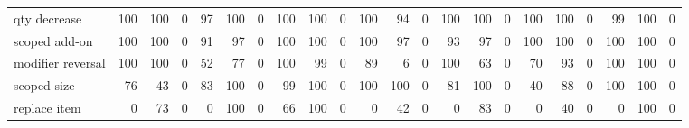 \begin{tabular}{lrrrrrrrrrrrrrrrrrrrrr}
qty decrease & \cellcolor[gray]{0.65}100 & \cellcolor[gray]{0.65}100 & \cellcolor[gray]{1.00}0 & \cellcolor[gray]{0.66}97 & \cellcolor[gray]{0.65}100 & \cellcolor[gray]{1.00}0 & \cellcolor[gray]{0.65}100 & \cellcolor[gray]{0.65}100 & \cellcolor[gray]{1.00}0 & \cellcolor[gray]{0.65}100 & \cellcolor[gray]{0.67}94 & \cellcolor[gray]{1.00}0 & \cellcolor[gray]{0.65}100 & \cellcolor[gray]{0.65}100 & \cellcolor[gray]{1.00}0 & \cellcolor[gray]{0.65}100 & \cellcolor[gray]{0.65}100 & \cellcolor[gray]{1.00}0 & \cellcolor[gray]{0.65}99 & \cellcolor[gray]{0.65}100 & \cellcolor[gray]{1.00}0 \\
scoped add-on & \cellcolor[gray]{0.65}100 & \cellcolor[gray]{0.65}100 & \cellcolor[gray]{1.00}0 & \cellcolor[gray]{0.68}91 & \cellcolor[gray]{0.66}97 & \cellcolor[gray]{1.00}0 & \cellcolor[gray]{0.65}100 & \cellcolor[gray]{0.65}100 & \cellcolor[gray]{1.00}0 & \cellcolor[gray]{0.65}100 & \cellcolor[gray]{0.66}97 & \cellcolor[gray]{1.00}0 & \cellcolor[gray]{0.67}93 & \cellcolor[gray]{0.66}97 & \cellcolor[gray]{1.00}0 & \cellcolor[gray]{0.65}100 & \cellcolor[gray]{0.65}100 & \cellcolor[gray]{1.00}0 & \cellcolor[gray]{0.65}100 & \cellcolor[gray]{0.65}100 & \cellcolor[gray]{1.00}0 \\
modifier reversal & \cellcolor[gray]{0.65}100 & \cellcolor[gray]{0.65}100 & \cellcolor[gray]{1.00}0 & \cellcolor[gray]{0.82}52 & \cellcolor[gray]{0.73}77 & \cellcolor[gray]{1.00}0 & \cellcolor[gray]{0.65}100 & \cellcolor[gray]{0.65}99 & \cellcolor[gray]{1.00}0 & \cellcolor[gray]{0.69}89 & \cellcolor[gray]{0.98}6 & \cellcolor[gray]{1.00}0 & \cellcolor[gray]{0.65}100 & \cellcolor[gray]{0.78}63 & \cellcolor[gray]{1.00}0 & \cellcolor[gray]{0.76}70 & \cellcolor[gray]{0.67}93 & \cellcolor[gray]{1.00}0 & \cellcolor[gray]{0.65}100 & \cellcolor[gray]{0.65}100 & \cellcolor[gray]{1.00}0 \\
scoped size & \cellcolor[gray]{0.74}76 & \cellcolor[gray]{0.85}43 & \cellcolor[gray]{1.00}0 & \cellcolor[gray]{0.71}83 & \cellcolor[gray]{0.65}100 & \cellcolor[gray]{1.00}0 & \cellcolor[gray]{0.65}99 & \cellcolor[gray]{0.65}100 & \cellcolor[gray]{1.00}0 & \cellcolor[gray]{0.65}100 & \cellcolor[gray]{0.65}100 & \cellcolor[gray]{1.00}0 & \cellcolor[gray]{0.72}81 & \cellcolor[gray]{0.65}100 & \cellcolor[gray]{1.00}0 & \cellcolor[gray]{0.86}40 & \cellcolor[gray]{0.69}88 & \cellcolor[gray]{1.00}0 & \cellcolor[gray]{0.65}100 & \cellcolor[gray]{0.65}100 & \cellcolor[gray]{1.00}0 \\
replace item & \cellcolor[gray]{1.00}0 & \cellcolor[gray]{0.74}73 & \cellcolor[gray]{1.00}0 & \cellcolor[gray]{1.00}0 & \cellcolor[gray]{0.65}100 & \cellcolor[gray]{1.00}0 & \cellcolor[gray]{0.77}66 & \cellcolor[gray]{0.65}100 & \cellcolor[gray]{1.00}0 & \cellcolor[gray]{1.00}0 & \cellcolor[gray]{0.85}42 & \cellcolor[gray]{1.00}0 & \cellcolor[gray]{1.00}0 & \cellcolor[gray]{0.71}83 & \cellcolor[gray]{1.00}0 & \cellcolor[gray]{1.00}0 & \cellcolor[gray]{0.86}40 & \cellcolor[gray]{1.00}0 & \cellcolor[gray]{1.00}0 & \cellcolor[gray]{0.65}100 & \cellcolor[gray]{1.00}0 \\

\end{tabular}
